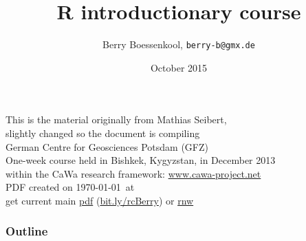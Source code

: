 \documentclass[xcolor=table, xcolor=dvipsnames]{beamer}\usepackage[]{graphicx}\usepackage[]{color}
\title{R introductionary course}
\author{Berry Boessenkool, \texttt{berry-b@gmx.de}}
\date{October 2015}
\begin{document}








\begin{frame}
	\titlepage
  \begin{center}
  \alert{This is the material originally from Mathias Seibert,\\ slightly changed so the document is compiling}\\[1em]
  German Centre for Geosciences Potsdam (GFZ) \\
  One-week course held in Bishkek, Kygyzstan, in December 2013 \\
  within the CaWa research framework: 
  \href{http://www.cawa-project.net/story/300}{www.cawa-project.net}\\[1em]
  \tiny  PDF created on \today\ at \currenttime\ \\
  \small get current main \href{https://dl.dropboxusercontent.com/u/4836866/R_course_Berry/RcourseBerry.pdf}{pdf} (\href{http://bit.ly/rcBerry}{bit.ly/rcBerry}) or 
  \href{https://dl.dropboxusercontent.com/u/4836866/R_course_Berry/RcourseBerry.Rnw}{rnw}
  \end{center}
\end{frame}

\begin{frame}\frametitle{Outline}
\tableofcontents[hideallsubsections]
\label{toc}
\end{frame}
\end{document}
